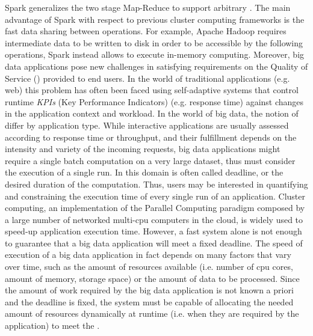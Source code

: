 Spark generalizes the two stage Map-Reduce to support arbitrary \plans. The main advantage of Spark with respect to previous cluster computing frameworks is the fast data sharing between operations. For example, Apache Hadoop requires intermediate data to be written to disk in order to be accessible by the following operations, Spark instead allows to execute in-memory computing. Moreover, big data applications pose new challenges in satisfying requirements on the Quality of Service (\qos) provided to end users. In the world of traditional applications (e.g. web) this problem has often been faced using self-adaptive systems that control runtime \textit{KPIs} (Key Performance Indicators) (e.g.  response time) against changes in the application context and workload. In the world of big data, the notion of \qos differ by application type. While interactive applications are usually assessed according to response time or throughput, and their fulfillment depends on the intensity and variety of the incoming requests, big data applications might require a single batch computation on a very large dataset, thus \qos must consider the execution of a single run. In this domain \qos is often called deadline, or the desired duration of the computation. Thus, users may be interested in quantifying and constraining the execution time of every single run of an application. Cluster computing, an implementation of the Parallel Computing paradigm composed by a large number of networked multi-cpu computers in the cloud, is widely used to speed-up application execution time. However, a fast system alone is not enough to guarantee that a big data application will meet a fixed deadline. The speed of execution of a big data application in fact depends on many factors that vary over time, such as the amount of resources available (i.e. number of cpu cores, amount of memory, storage space) or the amount of data to be processed. Since the amount of work required by the big data application is not known a priori and the deadline is fixed, the system must be capable of allocating the needed amount of resources dynamically at runtime (i.e. when they are required by the application) to meet the \qos. 
